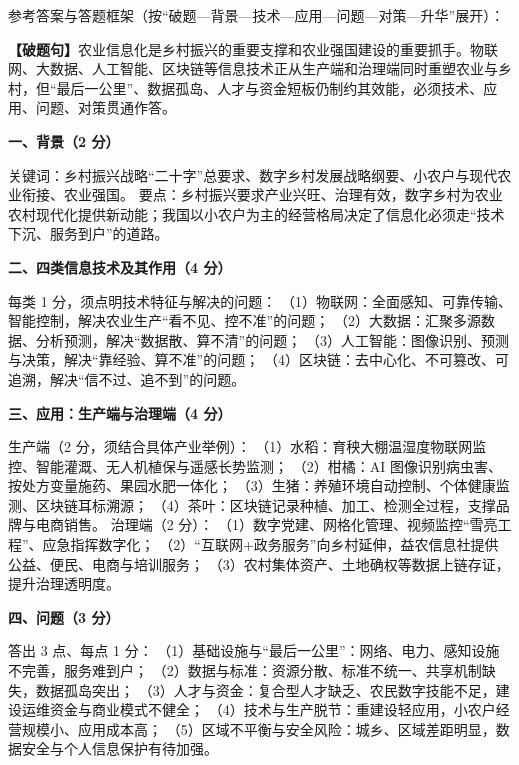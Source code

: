 \documentclass[a4paper,11pt]{article}
\begin{document}

\q 参考答案与答题框架（按“破题—背景—技术—应用—问题—对策—升华”展开）：

\textbf{【破题句】}农业信息化是乡村振兴的重要支撑和农业强国建设的重要抓手。物联网、大数据、人工智能、区块链等信息技术正从生产端和治理端同时重塑农业与乡村，但“最后一公里”、数据孤岛、人才与资金短板仍制约其效能，必须技术、应用、问题、对策贯通作答。

\textbf{一、背景（2 分）}
\begin{analysis}
关键词：乡村振兴战略“二十字”总要求、数字乡村发展战略纲要、小农户与现代农业衔接、农业强国。
要点：乡村振兴要求产业兴旺、治理有效，数字乡村为农业农村现代化提供新动能；我国以小农户为主的经营格局决定了信息化必须走“技术下沉、服务到户”的道路。
\end{analysis}

\textbf{二、四类信息技术及其作用（4 分）}
\begin{analysis}
每类 1 分，须点明技术特征与解决的问题：
（1）物联网：全面感知、可靠传输、智能控制，解决农业生产“看不见、控不准”的问题；
（2）大数据：汇聚多源数据、分析预测，解决“数据散、算不清”的问题；
（3）人工智能：图像识别、预测与决策，解决“靠经验、算不准”的问题；
（4）区块链：去中心化、不可篡改、可追溯，解决“信不过、追不到”的问题。
\end{analysis}

\textbf{三、应用：生产端与治理端（4 分）}
\begin{analysis}
生产端（2 分，须结合具体产业举例）：
（1）水稻：育秧大棚温湿度物联网监控、智能灌溉、无人机植保与遥感长势监测；
（2）柑橘：AI 图像识别病虫害、按处方变量施药、果园水肥一体化；
（3）生猪：养殖环境自动控制、个体健康监测、区块链耳标溯源；
（4）茶叶：区块链记录种植、加工、检测全过程，支撑品牌与电商销售。
治理端（2 分）：
（1）数字党建、网格化管理、视频监控“雪亮工程”、应急指挥数字化；
（2）“互联网+政务服务”向乡村延伸，益农信息社提供公益、便民、电商与培训服务；
（3）农村集体资产、土地确权等数据上链存证，提升治理透明度。
\end{analysis}

\textbf{四、问题（3 分）}
\begin{analysis}
答出 3 点、每点 1 分：
（1）基础设施与“最后一公里”：网络、电力、感知设施不完善，服务难到户；
（2）数据与标准：资源分散、标准不统一、共享机制缺失，数据孤岛突出；
（3）人才与资金：复合型人才缺乏、农民数字技能不足，建设运维资金与商业模式不健全；
（4）技术与生产脱节：重建设轻应用，小农户经营规模小、应用成本高；
（5）区域不平衡与安全风险：城乡、区域差距明显，数据安全与个人信息保护有待加强。
\end{analysis}
\end{document}

